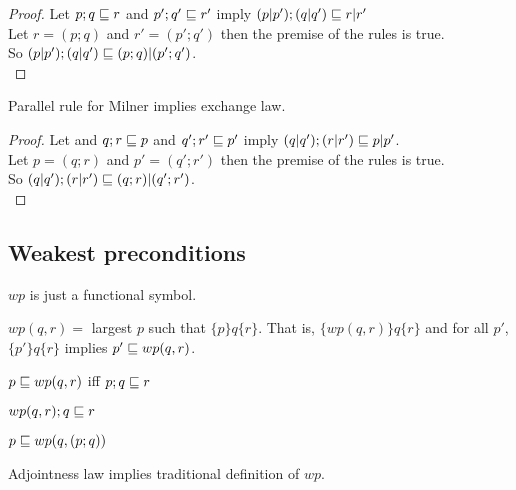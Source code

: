 \documentclass{article}
\begin{document}
\verified

\begin{proof}
Let $p; q \sqsubseteq r$ and $p'; q' \sqsubseteq r'$ imply $(p | p'); (q | q') \sqsubseteq r | r'$\\
Let $r = (p; q)$ and $r' = (p'; q')$ then the premise of the rules is true.\\
So $(p | p'); (q | q') \sqsubseteq (p; q) | (p'; q')$.\\
\end{proof}

\begin{theorem}
Parallel rule for Milner implies exchange law.
\end{theorem}

\verified

\begin{proof}
Let and $q; r \sqsubseteq p$ and $q'; r' \sqsubseteq p'$ imply $(q | q'); (r | r') \sqsubseteq p | p'$.\\
Let $p = (q; r)$ and $p' = (q'; r')$ then the premise of the rules is true.\\
So $(q | q'); (r | r') \sqsubseteq (q; r) | (q'; r')$.\\
\end{proof}

\subsection*{Weakest preconditions}

$wp$ is just a functional symbol.

\begin{definition}
$wp(q, r) =$ largest $p$ such that $\{p\}q\{r\}$.
That is, $\{wp(q, r)\} q \{r\}$ and
for all $p'$, $\{p'\}q\{r\}$ implies $p' \sqsubseteq wp(q, r)$.
\end{definition}

\begin{law}[Adjointness]
$p \sqsubseteq wp(q, r)$ iff $p; q \sqsubseteq r$
\end{law}

\begin{rul}[WP1]
$wp(q, r); q \sqsubseteq r$
\end{rul}

\begin{rul}[WP2]
$p \sqsubseteq wp(q, (p; q))$
\end{rul}

\begin{theorem}
Adjointness law implies traditional definition of $wp$.
\end{theorem}
\end{document}
